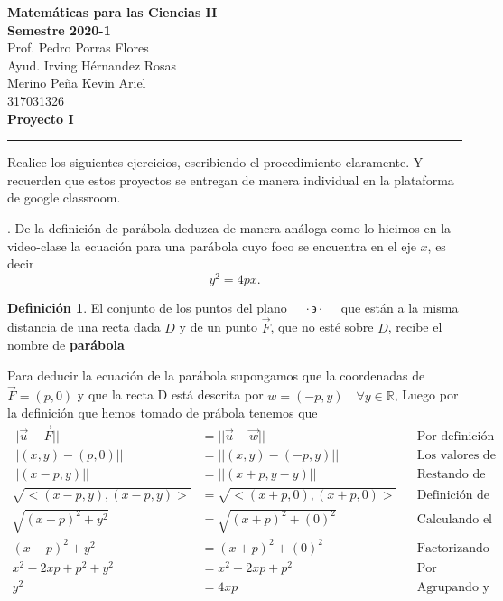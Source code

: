 \documentclass[letterpaper]{article}
\newcommand{\tq}{ \quad \cdot  \backepsilon \cdot \quad }
\newcommand{\R}{\mathds{R}}
\renewcommand{\*}{\cdot}
\theoremstyle{definition}
\newtheorem{definition}{Definición}
\begin{document}
\begin{center}
	\textbf{\large Matemáticas para las Ciencias II}\\
	\textbf{ Semestre 2020-1}\\
	Prof. Pedro Porras Flores\\
	Ayud. Irving Hérnandez Rosas \\
	Merino Peña Kevin Ariel\\ 317031326\\
	\textbf{Proyecto I}
\end{center}
\rule{17cm}{0.3mm}

\noindent Realice los siguientes ejercicios, escribiendo el procedimiento claramente. Y recuerden que estos proyectos se entregan de manera individual en la plataforma de google classroom. 	
	
	  . De la definición de parábola deduzca de manera análoga como lo hicimos en la video-clase la ecuación para una parábola cuyo foco se encuentra en el eje $x$, es decir $$y^2 = 4px.$$ 
	
	\begin{definition}
		El conjunto de los puntos del plano $ \tq $ que están a la misma distancia de una recta dada $ D $ y de un punto $ \vec{F} $, que no esté sobre $ D $, recibe el nombre de \textbf{parábola}
	\end{definition}
	Para deducir la ecuación de la parábola supongamos que la coordenadas de $ \vec{F} = (p,0) $ y que la recta D está descrita por $ w = (-p,y) \quad \forall y \in \R $, Luego por la definición que hemos tomado de prábola tenemos que 
	\begin{align*}
	||\vec{u} - \vec{F} || &= || \vec{u} - \vec{w} || && \text{Por definición de distancia} \\
	||(x,y) - (p,0) || &= || (x,y) - (-p,y) || && \text{Los valores de dichos vectores  } \\
	||(x -p,y)|| &= || (x +p,y-y)|| && \text{Restando de manera directa} \\
	\sqrt{<(x -p,y),(x -p,y)>} &= \sqrt{<(x +p,0),(x +p,0)>} && \text{Definición de la norma en vectores } \\
	\sqrt{(x -p)^2 +y^2} &= \sqrt{(x +p)^2 +(0)^2} && \text{Calculando el producto interior  } \\
	(x -p)^2 +y^2 &= (x +p)^2 +(0)^2 && \text{Factorizando } \\
	x^2 -2xp +p^2 +y^2 &= x^2 +2xp +p^2 && \text{Por distributividad  } \\
	y^2 &= 4xp && \text{Agrupando y sumando términos semejantes}
	\end{align*}
	
\end{document}
